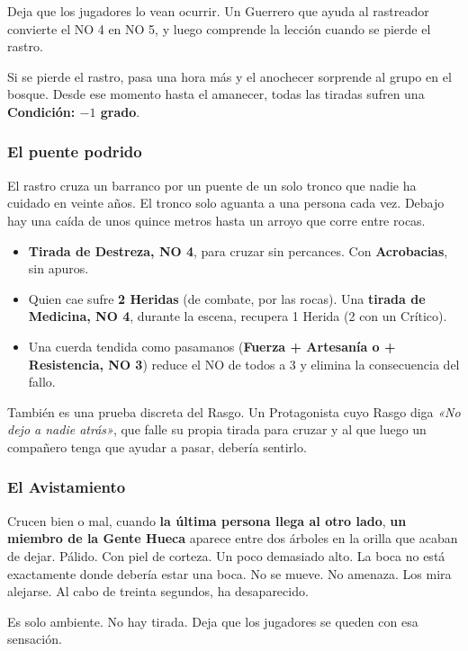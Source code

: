 \documentclass[10pt,a4paper]{article}
\newcommand{\tightlist}{\setlength{\itemsep}{0pt}\setlength{\parskip}{0pt}}
\begin{document}
Deja que los jugadores lo vean ocurrir. Un Guerrero que ayuda al rastreador convierte el NO 4 en NO 5, y luego comprende la lección cuando se pierde el rastro.

Si se pierde el rastro, pasa una hora más y el anochecer sorprende al grupo en el bosque. Desde ese momento hasta el amanecer, todas las tiradas sufren una \textbf{Condición: $-1$ grado}.

\subsubsection{El puente podrido}\label{el-puente-podrido}

El rastro cruza un barranco por un puente de un solo tronco que nadie ha cuidado en veinte años. El tronco solo aguanta a una persona cada vez. Debajo hay una caída de unos quince metros hasta un arroyo que corre entre rocas.

\begin{itemize}
\tightlist
\item
  \textbf{Tirada de Destreza, NO 4}, para cruzar sin percances. Con \textbf{Acrobacias}, sin apuros.
\item
  Quien cae sufre \textbf{2 Heridas} (de combate, por las rocas). Una \textbf{tirada de Medicina, NO 4}, durante la escena, recupera 1 Herida (2 con un Crítico).
\item
  Una cuerda tendida como pasamanos (\textbf{Fuerza + Artesanía o + Resistencia, NO 3}) reduce el NO de todos a 3 y elimina la consecuencia del fallo.
\end{itemize}

También es una prueba discreta del Rasgo. Un Protagonista cuyo Rasgo diga \emph{«No dejo a nadie atrás»}, que falle su propia tirada para cruzar y al que luego un compañero tenga que ayudar a pasar, debería sentirlo.

\subsubsection{El Avistamiento}\label{el-avistamiento}

Crucen bien o mal, cuando \textbf{la última persona llega al otro lado}, \textbf{un miembro de la Gente Hueca} aparece entre dos árboles en la orilla que acaban de dejar. Pálido. Con piel de corteza. Un poco demasiado alto. La boca no está exactamente donde debería estar una boca. No se mueve. No amenaza. Los mira alejarse. Al cabo de treinta segundos, ha desaparecido.

Es solo ambiente. No hay tirada. Deja que los jugadores se queden con esa sensación.
\end{document}
